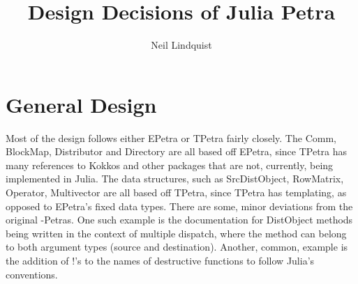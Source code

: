 \documentclass{article}
\title{Design Decisions of Julia Petra}
\author{Neil Lindquist}
\begin{document}
\section{General Design}
Most of the design follows either EPetra or TPetra fairly closely.  The Comm, BlockMap, Distributor and Directory are all based off EPetra, since TPetra has many references to Kokkos and other packages that are not, currently, being implemented in Julia.
The data structures, such as SrcDistObject, RowMatrix, Operator, Multivector are all based off TPetra, since TPetra has templating, as opposed to EPetra's fixed data types.
There are some, minor deviations from the original -Petras.
	One such example is the documentation for DistObject methods being written in the context of multiple dispatch, where the method can belong to both argument types (source and destination).  
	Another, common, example is the addition of \(!\)'s to the names of destructive functions to follow Julia's conventions.
\end{document}

